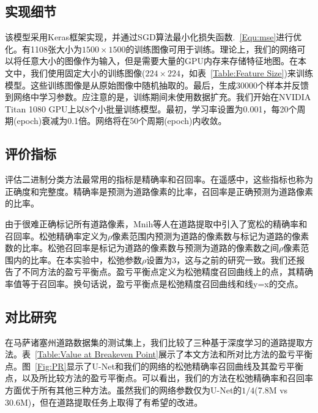 \begin{translation}
\subsection{实现细节}

该模型采用Keras\cite{25}框架实现，并通过SGD算法最小化损失函数.~\ref{Equ:mse}进行优化。有1108张大小为$1500\times1500$的训练图像可用于训练。理论上，我们的网络可以将任意大小的图像作为输入，但是需要大量的GPU内存来存储特征地图。在本文中，我们使用固定大小的训练图像($224\times224$，如表~\ref{Table:Feature Size})来训练模型。这些训练图像是从原始图像中随机抽取的。最后，生成30000个样本并反馈到网络中学习参数。应注意的是，训练期间未使用数据扩充。我们开始在NVIDIA Titan 1080 GPU上以8个小批量训练模型。最初，学习率设置为0.001，每20个周期(epoch)衰减为0.1倍。网络将在50个周期(epoch)内收敛。

\subsection{评价指标}

评估二进制分类方法最常用的指标是精确率和召回率。在遥感中，这些指标也称为正确度和完整度。精确率是预测为道路像素的比率，召回率是正确预测为道路像素的比率。

由于很难正确标记所有道路像素，Mnih等人\cite{2}在道路提取中引入了宽松的精确率和召回率\cite{26}。松弛精确率定义为$\rho$像素范围内预测为道路的像素数与标记为道路的像素数的比率。松弛召回率是标记为道路的像素数与预测为道路的像素数之间$\rho$像素范围内的比率。在本实验中，松弛参数$\rho$设置为3，这与之前的研究\cite{2,5}一致。我们还报告了不同方法的盈亏平衡点。盈亏平衡点定义为松弛精度召回曲线上的点，其精确率值等于召回率。换句话说，盈亏平衡点是松弛精度召回曲线和线y=x的交点。

\subsection{对比研究}

在马萨诸塞州道路数据集的测试集上，我们比较了三种基于深度学习的道路提取方法。表~\ref{Table:Value at Breakeven Point}展示了本文方法和所对比方法的盈亏平衡点。图~\ref{Fig:PR}显示了U-Net和我们的网络的松弛精确率召回曲线及其盈亏平衡点，以及所比较方法的盈亏平衡点。可以看出，我们的方法在松弛精确率和召回率方面优于所有其他三种方法。虽然我们的网络参数仅为U-Net的$1/4$(7.8M vs 30.6M)，但在道路提取任务上取得了有希望的改进。


\end{translation}
